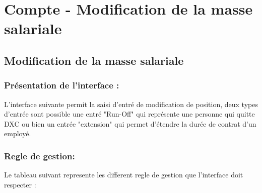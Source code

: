 
\section{Compte - Modification de la masse salariale}


\subsection{Modification de la masse salariale}

\subsubsection{Présentation de l'interface :}

L'interface suivante permit la saisi d'entré de modification de position, deux types d'entrée sont possible une entré "Run-Off" qui représente une personne qui quitte DXC ou bien un entrée "extension" qui permet d'étendre la durée de contrat d'un employé.

\subsubsection{Regle de gestion:}

Le tableau suivant represente les different regle de gestion que l'interface doit respecter :

\vspace{0.2cm}

